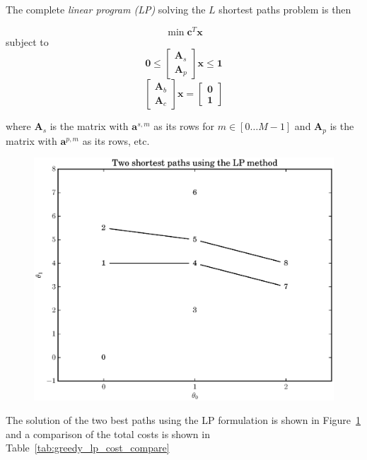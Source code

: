 \documentclass[letterpaper,12pt]{report}
\begin{document}
The complete \textit{linear program (LP)} solving the $L$ shortest paths problem is then
\begin{samepage}
\[
        \min \boldsymbol{c}^{T}\boldsymbol{x}
\]
subject to
\[
    \boldsymbol{0} \leq
    \begin{bmatrix}
        \boldsymbol{A}_{s} \\
        \boldsymbol{A}_{p}
    \end{bmatrix} \boldsymbol{x}
    \leq \boldsymbol{1}
\]
\[
    \begin{bmatrix}
        \boldsymbol{A}_{b} \\
        \boldsymbol{A}_{c}
    \end{bmatrix}
    \boldsymbol{x}
    =
    \begin{bmatrix}
        \boldsymbol{0} \\
        \boldsymbol{1}
    \end{bmatrix}
\]
\end{samepage}
where $\boldsymbol{A}_{s}$ is the matrix with $\boldsymbol{a}^{s,m}$ as its rows
for $m \in [0 \dotsc M-1]$ and $\boldsymbol{A}_{p}$ is the matrix with
$\boldsymbol{a}^{p,m}$ as its rows, etc.

\begin{figure}
    \caption{\label{plot:simple_graph_lp_paths}}
    \includegraphics[width=\textwidth]{plots/small_graph_ex_lp_paths.eps}
\end{figure}

The solution of the two best paths using the LP formulation
is shown in Figure~\ref{plot:simple_graph_lp_paths} and a comparison of the
total costs is shown in Table~\ref{tab:greedy_lp_cost_compare}
\end{document}
